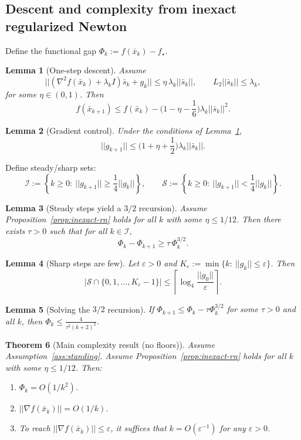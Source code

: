 \documentclass[11pt,a4paper]{article}
\def\cO{O}%
\def\norm#1{||#1||}%
\newtheorem{theorem}{Theorem}[section]
\newtheorem{lemma}[theorem]{Lemma}
\newcommand{\norm}[1]{\left\|#1\right\|}
\newcommand{\cO}{\mathcal{O}}
\begin{document}
\subsection{Descent and complexity from inexact regularized Newton}
Define the functional gap $\Phi_k:=f(\bar x_k)-f_\star$.

\begin{lemma}[One-step descent]\label{lem:descent-inexact}
	Assume
	\[
	\norm{(\nabla^2 f(\bar x_k)+\lambda_k I)\bar s_k+g_k}\le \eta\,\lambda_k\norm{\bar s_k},
	\qquad
	L_2\norm{\bar s_k}\le \lambda_k,
	\]
	for some $\eta\in(0,1)$.
	Then
	\[
	f(\bar x_{k+1})\le f(\bar x_k) - \Big(1-\eta-\frac16\Big)\lambda_k\norm{\bar s_k}^2.
	\]
\end{lemma}

\begin{lemma}[Gradient control]\label{lem:grad-inexact}
	Under the conditions of Lemma~\ref{lem:descent-inexact},
	\[
	\norm{g_{k+1}}\le \Big(1+\eta+\frac12\Big)\lambda_k\norm{\bar s_k}.
	\]
\end{lemma}

Define steady/sharp sets:
\[
\mathcal I:=\left\{k\ge 0:\ \norm{g_{k+1}}\ge \frac14\norm{g_k}\right\},
\qquad
\mathcal S:=\left\{k\ge 0:\ \norm{g_{k+1}}< \frac14\norm{g_k}\right\}.
\]

\begin{lemma}[Steady steps yield a $3/2$ recursion]\label{lem:steady-rec}
	Assume Proposition~\ref{prop:inexact-rn} holds for all $k$ with some $\eta\le 1/12$.
	Then there exists $\tau>0$ such that for all $k\in\mathcal I$,
	\[
	\Phi_k-\Phi_{k+1}\ge \tau\,\Phi_k^{3/2}.
	\]
\end{lemma}

\begin{lemma}[Sharp steps are few]\label{lem:sharp-count}
	Let $\varepsilon>0$ and $K_\varepsilon:=\min\{k:\ \norm{g_k}\le \varepsilon\}$.
	Then
	\[
	|\mathcal S\cap\{0,1,\dots,K_\varepsilon-1\}|
	\le \left\lceil \log_4\frac{\norm{g_0}}{\varepsilon}\right\rceil.
	\]
\end{lemma}

\begin{lemma}[Solving the $3/2$ recursion]\label{lem:telescoping}
	If $\Phi_{k+1}\le \Phi_k-\tau \Phi_k^{3/2}$ for some $\tau>0$ and all $k$, then
	$\Phi_k\le \frac{4}{\tau^2(k+2)^2}$.
\end{lemma}

\begin{theorem}[Main complexity result (no floors)]\label{thm:main}
	Assume Assumption~\ref{ass:standing}.
	Assume Proposition~\ref{prop:inexact-rn} holds for all $k$ with some $\eta\le 1/12$.
	Then:
	\begin{enumerate}[leftmargin=1.2em,itemsep=2pt]
		\item $\Phi_k=\cO(1/k^2)$.
		\item $\norm{\nabla f(\bar x_k)}=\cO(1/k)$.
		\item To reach $\norm{\nabla f(\bar x_k)}\le \varepsilon$, it suffices that $k=\cO(\varepsilon^{-1})$ for any $\varepsilon>0$.
	\end{enumerate}
\end{theorem}
\end{document}
